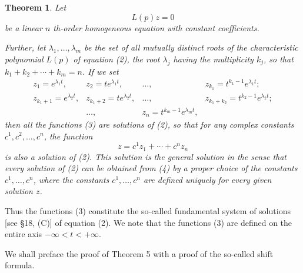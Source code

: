 \documentclass[10pt,a5paper]{book}
\theoremstyle{plain}
\newtheorem{theorem}{Theorem}
\theoremstyle{definition}
\theoremstyle{remark}
\begin{document}
\begin{theorem}
Let
\begin{equation*}
L(p) z=0 \tag{2}
\end{equation*}
be a linear $n$ th-order homogeneous equation with constant coefficients.

Further, let $\lambda_{1}, \ldots, \lambda_{m}$ be the set of all mutually distinct roots of the characteristic polynomial $L(p)$ of equation (2), the root $\lambda_{j}$ having the multiplicity $k_{j}$, so that $k_{1}+k_{2}+\cdots+k_{m}=n$. If we set
\[
\begin{array}{rrrr}
z_{1}=e^{\lambda_{1} t}, & z_{2}=t e^{\lambda_{1} t}, & \ldots, & z_{k_{1}}=t^{k_{1}-1} e^{\lambda_{1} t} ; \\
z_{k_{1}+1}=e^{\lambda_{2} t}, & z_{k_{1}+2}=t e^{\lambda_{2} t}, & \ldots, & z_{k_{1}+k_{2}}=t^{k_{2}-1} e^{\lambda_{2} t} ;  \tag{3}\\
& \ldots, & z_{n}=t^{k_{m}-1} e^{\lambda_{m} t},
\end{array}
\]
then all the functions (3) are solutions of (2), so that for any complex constants $c^{1}, c^{2}, \ldots, c^{n}$, the function
\begin{equation*}
z=c^{1} z_{1}+\cdots+c^{n} z_{n} \tag{4}
\end{equation*}
is also a solution of (2). This solution is the general solution in the sense that every solution of (2) can be obtained from (4) by a proper choice of the constants $c^{1}, \ldots, c^{n}$, where the constants $c^{1}, \ldots, c^{n}$ are defined uniquely for every given solution $z$.
\end{theorem}

Thus the functions (3) constitute the so-called fundamental system of solutions [see §18, (C)] of equation (2). We note that the functions (3) are defined on the entire axis $-\infty<t<+\infty$.

We shall preface the proof of Theorem 5 with a proof of the so-called shift formula.
\end{document}
